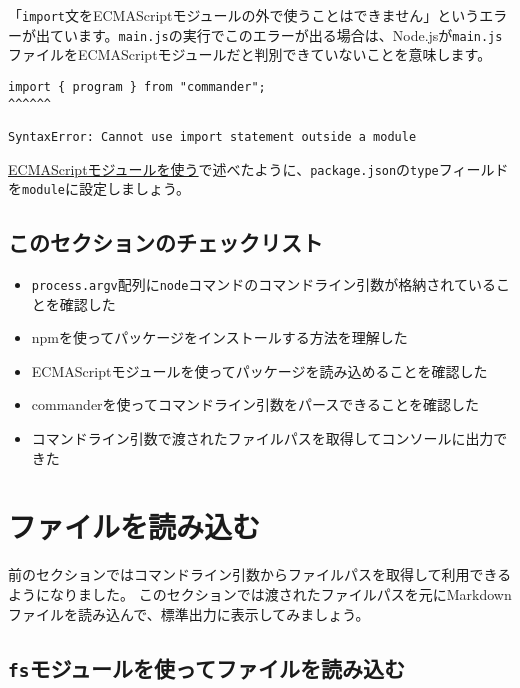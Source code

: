 「\texttt{import}文をECMAScriptモジュールの外で使うことはできません」というエラーが出ています。\texttt{main.js}の実行でこのエラーが出る場合は、Node.jsが\texttt{main.js}ファイルをECMAScriptモジュールだと判別できていないことを意味します。

\begin{lstlisting}
import { program } from "commander";
^^^^^^

SyntaxError: Cannot use import statement outside a module
\end{lstlisting}

\hyperlink{esmodule}{ECMAScriptモジュールを使う}で述べたように、\texttt{package.json}の\texttt{type}フィールドを\texttt{module}に設定しましょう。

\hypertarget{section-checklist}{%
\subsection{このセクションのチェックリスト}\label{section-checklist}}

\begin{itemize}
\item
  \texttt{process.argv}配列に\texttt{node}コマンドのコマンドライン引数が格納されていることを確認した
\item
  npmを使ってパッケージをインストールする方法を理解した
\item
  ECMAScriptモジュールを使ってパッケージを読み込めることを確認した
\item
  commanderを使ってコマンドライン引数をパースできることを確認した
\item
  コマンドライン引数で渡されたファイルパスを取得してコンソールに出力できた
\end{itemize}

\hypertarget{read-file}{%
\section{ファイルを読み込む}\label{read-file}}

前のセクションではコマンドライン引数からファイルパスを取得して利用できるようになりました。
このセクションでは渡されたファイルパスを元にMarkdownファイルを読み込んで、標準出力に表示してみましょう。

\hypertarget{read-file-by-fs}{%
\subsection{\texorpdfstring{\texttt{fs}モジュールを使ってファイルを読み込む}{fsモジュールを使ってファイルを読み込む}}\label{read-file-by-fs}}

